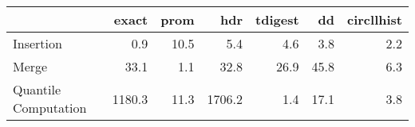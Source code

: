 \begin{tabular}{lrrrrrr}
\toprule
{} &  exact &  prom &    hdr &  tdigest &   dd &  circllhist \\
\midrule
Insertion            &    0.9 &  10.5 &    5.4 &      4.6 &  3.8 &         2.2 \\
Merge                &   33.1 &   1.1 &   32.8 &     26.9 & 45.8 &         6.3 \\
Quantile Computation & 1180.3 &  11.3 & 1706.2 &      1.4 & 17.1 &         3.8 \\
\bottomrule
\end{tabular}
